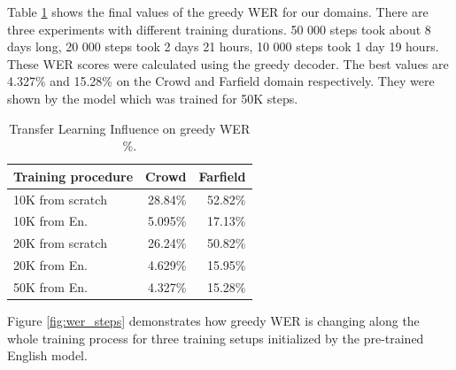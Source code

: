 \documentclass[a4paper]{article}
\begin{document}
Table \ref{tab:wer_50k} shows the final values of the greedy WER for our domains. There are three experiments with different training durations. 50 000 steps took about 8 days long, 20 000 steps took 2 days 21 hours, 10 000 steps took 1 day 19 hours. These WER scores were calculated using the greedy decoder. The best values are 4.327\% and 15.28\% on the Crowd and Farfield domain respectively. They were shown by the model which was trained for 50K steps.  

\begin{table}[t]
  \caption{Transfer Learning Influence on greedy WER \%.}
  \label{tab:wer_50k}
  \centering
  \begin{tabular}{lrr}
    \toprule
    \textbf{Training procedure } & \textbf{Crowd} & \textbf{Farfield} \\
    \midrule
    10K from scratch   &  28.84\%   & 52.82\% \\
    10K from En.    & 5.095\%       & 17.13\%  \\
    \midrule
    20K from scratch   &  26.24\%   & 50.82\% \\
    20K from En.    & 4.629\%       & 15.95\% \\
    \midrule
    50K from En.    & 4.327\%       & 15.28\% \\
    \bottomrule
  \end{tabular}
\end{table}


Figure \ref{fig:wer_steps} demonstrates how greedy WER is changing along the whole training process for three training setups initialized by the pre-trained English model.  
\end{document}
